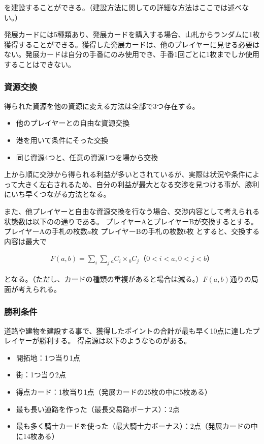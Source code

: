 \documentclass[a4, 10pt,dvipdfmx]{jsarticle}
\begin{document}
を建設することができる。（建設方法に関しての詳細な方法はここでは述べない。）

発展カードには5種類あり、発展カードを購入する場合、山札からランダムに1枚獲得することができる。獲得した発展カードは、他のプレイヤーに見せる必要はない。発展カードは自分の手番にのみ使用でき、手番1回ごとに1枚までしか使用することはできない。

\subsubsection*{資源交換}
得られた資源を他の資源に変える方法は全部で3つ存在する。
\begin{itemize}
 \item 他のプレイヤーとの自由な資源交換
 \item 港を用いて条件にそった交換
 \item 同じ資源4つと、任意の資源1つを場から交換
\end{itemize}

上から順に交渉から得られる利益が多いとされているが、実際は状況や条件によって大きく左右されるため、自分の利益が最大となる交渉を見つける事が、勝利にいち早くつながる方法となる。

また、他プレイヤーと自由な資源交換を行なう場合、交渉内容として考えられる状態数は以下のの通りである。
プレイヤーAとプレイヤーBが交換するとする。
     プレイヤーAの手札の枚数$a$枚
     プレイヤーBの手札の枚数$b$枚 
とすると、交換する内容は最大で

\begin{eqnarray}
  F(a,b)=\sum_{i}\sum_{j}{}_a C _i\times{}_b C _j　（0<i<a,0<j<b）
\end{eqnarray}

となる。（ただし、カードの種類の重複があると場合は減る。）$F(a,b)$通りの局面が考えられる。

\subsubsection*{勝利条件}
道路や建物を建設する事で、獲得したポイントの合計が最も早く10点に達したプレイヤーが勝利する。
得点源は以下のようなものがある。
\begin{itemize}
 \item 開拓地：1つ当り1点
 \item 街：1つ当り2点
 \item 得点カード：1枚当り1点（発展カードの25枚の中に5枚ある）
 \item 最も長い道路を作った（最長交易路ボーナス）：2点
 \item 最も多く騎士カードを使った（最大騎士力ボーナス）：2点（発展カードの中に14枚ある）
\end{itemize}
\end{document}
